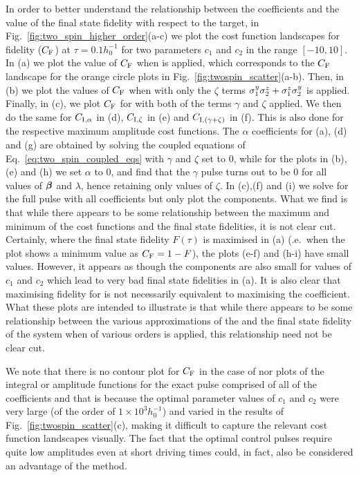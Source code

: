 In order to better understand the relationship between the  coefficients and the value of the final state fidelity with respect to the target, in Fig.~\ref{fig:two_spin_higher_order}(a-c) we plot the cost function landscapes for fidelity ($C_{\rm F}$) at $\tau = 0.1h_0^{-1}$ for two parameters $c_1$ and $c_2$ in the range $[-10, 10]$. In (a) we plot the value of $C_{\rm F}$ when   is applied, which corresponds to the $C_{\rm F}$ landscape for the orange circle plots in Fig.~\ref{fig:twospin_scatter}(a-b). Then, in (b) we plot the values of $C_{\rm F}$ when  with only the $\zeta$ terms $\sigma^y_1\sigma^z_2 + \sigma^z_1\sigma^y_2$ is applied. Finally, in (c), we plot $C_{\rm F}$ for   with both of the  terms $\gamma$ and $\zeta$ applied.  We then do the same for $C_{\rm I, \alpha}$ in (d), $C_{\rm I,\zeta}$ in (e) and $C_{\rm I,(\gamma + \zeta)}$ in (f). This is also done for the respective maximum amplitude cost functions. The $\alpha$ coefficients for (a), (d) and (g) are obtained by solving the coupled equations of Eq.~\eqref{eq:two_spin_coupled_eqs} with $\gamma$ and $\zeta$ set to $0$, while for the plots in (b),(e) and (h) we set $\alpha$ to $0$, and find that the $\gamma$ pulse turns out to be $0$ for all values of $\boldsymbol{\beta}$ and $\lambda$, hence retaining only values of $\zeta$. In (c),(f) and (i) we solve for the full  pulse with all coefficients but only plot the  components. What we find is that while there appears to be some relationship between the maximum and minimum of the  cost functions and the final state fidelities, it is not clear cut. Certainly, where the final state fidelity $F(\tau)$ is maximised in (a) (\@i.e.~when the plot shows a minimum value as $C_{\rm F} = 1 - F$), the   plots (e-f) and (h-i) have small values. However, it appears as though the  components are also small for values of $c_1$ and $c_2$ which lead to very bad final state fidelities in (a). It is also clear that maximising fidelity for   is not necessarily equivalent to maximising the   coefficient. What these plots are intended to illustrate is that while there appears to be some relationship between the various approximations of the  and the final state fidelity of the system when  of various orders is applied, this relationship need not be clear cut.

We note that there is no contour plot for $C_{\rm F}$ in the case of  nor plots of the integral or amplitude functions for the exact  pulse comprised of all of the  coefficients and that is because the optimal parameter values of $c_1$ and $c_2$ were very large (of the order of $1\times10^3 h_0^{-1}$) and varied in the results of Fig.~\ref{fig:twospin_scatter}(c), making it difficult to capture the relevant cost function landscapes visually. The fact that the  optimal control pulses require quite low amplitudes even at short driving times could, in fact, also be considered an advantage of the method.

